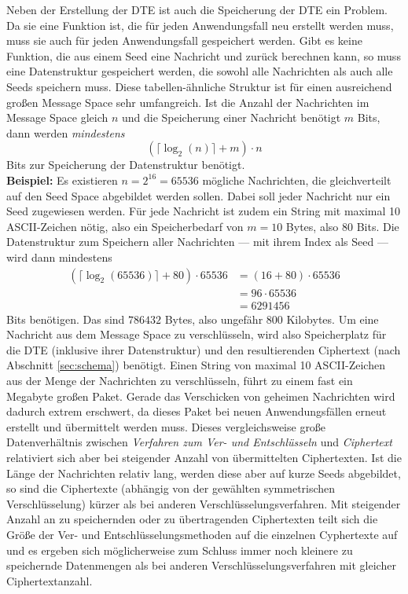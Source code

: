 Neben der Erstellung der DTE ist auch die Speicherung der DTE ein Problem. Da sie eine Funktion ist, die für jeden Anwendungsfall neu erstellt werden muss, muss sie auch für jeden Anwendungsfall gespeichert werden. Gibt es keine Funktion, die aus einem Seed eine Nachricht und zurück berechnen kann, so muss eine Datenstruktur gespeichert werden, die sowohl alle Nachrichten als auch alle Seeds speichern muss. Diese tabellen-ähnliche Struktur ist für einen ausreichend großen Message Space sehr umfangreich. Ist die Anzahl der Nachrichten im Message Space gleich $n$ und die Speicherung einer Nachricht benötigt $m$ Bits, dann werden \emph{mindestens}
$$(\lceil\log_2(n)\rceil + m) \cdot n$$
Bits zur Speicherung der Datenstruktur benötigt.\\
\textbf{Beispiel:} Es existieren $n = 2^{16} = 65536$ mögliche Nachrichten, die gleichverteilt auf den Seed Space abgebildet werden sollen. Dabei soll jeder Nachricht nur ein Seed zugewiesen werden. Für jede Nachricht ist zudem ein String mit maximal 10 ASCII-Zeichen nötig, also ein Speicherbedarf von $m = 10$ Bytes, also $80$ Bits. Die Datenstruktur zum Speichern aller Nachrichten --- mit ihrem Index als Seed --- wird dann mindestens
\begin{align*}
(\lceil\log_2(65536)\rceil + 80) \cdot 65536 &= (16 + 80) \cdot 65536\\
&= 96 \cdot 65536\\
&= 6 291 456
\end{align*}
Bits benötigen. Das sind $786 432$ Bytes, also ungefähr 800 Kilobytes. Um eine Nachricht aus dem Message Space zu verschlüsseln, wird also Speicherplatz für die DTE (inklusive ihrer Datenstruktur) und den resultierenden Ciphertext (nach Abschnitt \ref{sec:schema}) benötigt. Einen String von maximal 10 ASCII-Zeichen aus der Menge der Nachrichten zu verschlüsseln, führt zu einem fast ein Megabyte großen Paket. Gerade das Verschicken von geheimen Nachrichten wird dadurch extrem erschwert, da dieses Paket bei neuen Anwendungsfällen erneut erstellt und übermittelt werden muss. Dieses vergleichsweise große Datenverhältnis zwischen \emph{Verfahren zum Ver- und Entschlüsseln} und \emph{Ciphertext} relativiert sich aber bei steigender Anzahl von übermittelten Ciphertexten. Ist die Länge der Nachrichten relativ lang, werden diese aber auf kurze Seeds abgebildet, so sind die Ciphertexte (abhängig von der gewählten symmetrischen Verschlüsselung) kürzer als bei anderen Verschlüsselungsverfahren. Mit steigender Anzahl an zu speichernden oder zu übertragenden Ciphertexten teilt sich die Größe der Ver- und Entschlüsselungsmethoden auf die einzelnen Cyphertexte auf und es ergeben sich möglicherweise zum Schluss immer noch kleinere zu speichernde Datenmengen als bei anderen Verschlüsselungsverfahren mit gleicher Ciphertextanzahl.

